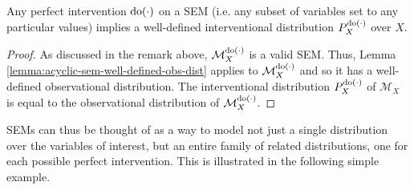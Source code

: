 \medskip

\begin{lemma}\label{lemma:acyclic-sem-well-defined-int-dist}
	Any perfect intervention $\operatorname{do}(\cdot)$ on a SEM (i.e. any subset of variables set to any particular values) implies a well-defined interventional distribution $P^{\operatorname{do}(\cdot)}_X$ over $X$.
\end{lemma}
\begin{proof}
	As discussed in the remark above, $\mathcal{M}_X^{\operatorname{do}(\cdot)}$ is a valid SEM. Thus, Lemma \ref{lemma:acyclic-sem-well-defined-obs-dist} applies to $\mathcal{M}_X^{\operatorname{do}(\cdot)}$ and so it has a well-defined observational distribution. 
	The interventional distribution $P_X^{\operatorname{do}(\cdot)}$ of $\mathcal{M}_X$ is equal to the observational distribution of $\mathcal{M}_X^{\operatorname{do}(\cdot)}$.
\end{proof}
	
SEMs can thus be thought of as a way to model not just a single distribution over the variables of interest, but an entire family of related distributions, one for each possible perfect intervention.
This is illustrated in the following simple example.

\medskip

